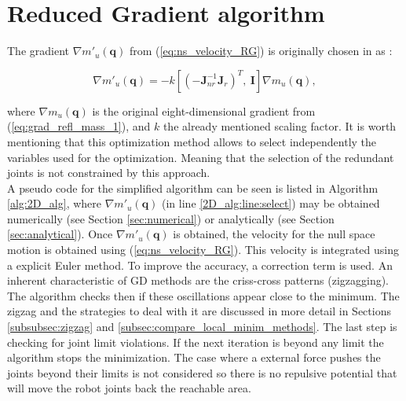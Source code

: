 

 





	
	






 



\section{Reduced Gradient algorithm}
\label{sec:1D2D}


The gradient $\nabla m'_u(\mathbf{q})$  from (\ref{eq:ns_velocity_RG}) is originally  chosen in \cite{reduced_gradient} as : 

\begin{equation}
 \nabla m'_u(\mathbf{q}) = - k \left[(-\mathbf{J}_{nr}^{-1} \mathbf{J}_r)^{T}, \   \mathbf{I} \right ] \nabla m_u(\mathbf{q})
 ,
\label{eq:RG_deLuca}
\end{equation}

where $\nabla m_u(\mathbf{q})$ is the original eight-dimensional gradient from  (\ref{eq:grad_refl_mass_1}), and $k$ the already mentioned scaling factor. 
It is worth mentioning that this optimization method allows to select independently the variables used for the optimization. Meaning that the selection of the redundant joints is not constrained by this approach. \\
%
A pseudo code for the simplified algorithm can be seen is listed in Algorithm \ref{alg:2D_alg}, where $\nabla m'_u(\mathbf{q})$ (in line \ref{2D_alg:line:select}) may be obtained numerically (see Section \ref{sec:numerical}) or analytically (see Section \ref{sec:analytical}). Once $\nabla m'_u(\mathbf{q})$ is obtained, the velocity for the null space motion is obtained using (\ref{eq:ns_velocity_RG}). This velocity is integrated using a explicit Euler method. To improve the accuracy, a correction term is used. An inherent characteristic of GD methods are the criss-cross patterns (zigzagging). The algorithm checks then if these oscillations appear  close to the minimum. The zigzag and the strategies to deal with it are discussed in more detail in Sections \ref{subsubsec:zigzag} and  \ref{subsec:compare_local_minim_methods}.
The last step is checking for joint limit violations. If the next iteration is beyond any limit the algorithm stops the  minimization. The case where a external force pushes the joints beyond their limits is not considered so there is no repulsive potential that will move the robot joints back the reachable area. 



